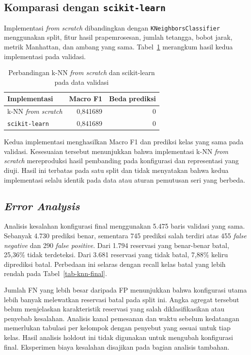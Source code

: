 \subsection{Komparasi dengan \texttt{scikit-learn}}

Implementasi \textit{from scratch} dibandingkan dengan \texttt{KNeighborsClassifier} menggunakan split, fitur hasil prapemrosesan, jumlah tetangga, bobot jarak, metrik Manhattan, dan ambang yang sama. Tabel~\ref{tab-knn-sklearn} merangkum hasil kedua implementasi pada validasi.

\begin{table}[H]
    \centering
    \caption{Perbandingan k-NN \textit{from scratch} dan scikit-learn pada data validasi}
    \label{tab-knn-sklearn}
    \begin{tabular}{lrr}
        \hline
        Implementasi          & Macro F1 & Beda prediksi \\
        \hline
        k-NN \textit{from scratch} & 0,841689 & 0             \\
        \texttt{scikit-learn} & 0,841689 & 0             \\
        \hline
    \end{tabular}
\end{table}

Kedua implementasi menghasilkan Macro F1 dan prediksi kelas yang sama pada validasi. Kesesuaian tersebut menunjukkan bahwa implementasi k-NN \textit{from scratch} mereproduksi hasil pembanding pada konfigurasi dan representasi yang diuji. Hasil ini terbatas pada satu split dan tidak menyatakan bahwa kedua implementasi selalu identik pada data atau aturan pemutusan seri yang berbeda.

\subsection{\textit{Error Analysis}}

Analisis kesalahan konfigurasi final menggunakan 5.475 baris validasi yang sama. Sebanyak 4.730 prediksi benar, sementara 745 prediksi salah terdiri atas 455 \textit{false negative} dan 290 \textit{false positive}. Dari 1.794 reservasi yang benar-benar batal, 25,36\% tidak terdeteksi. Dari 3.681 reservasi yang tidak batal, 7,88\% keliru diprediksi batal. Perbedaan ini selaras dengan recall kelas batal yang lebih rendah pada Tabel~\ref{tab-knn-final}.

Jumlah FN yang lebih besar daripada FP menunjukkan bahwa konfigurasi utama lebih banyak melewatkan reservasi batal pada split ini. Angka agregat tersebut belum menjelaskan karakteristik reservasi yang salah diklasifikasikan atau penyebab kesalahan. Analisis kanal pemesanan dan waktu sebelum kedatangan memerlukan tabulasi per kelompok dengan penyebut yang sesuai untuk tiap kelas. Hasil analisis holdout ini tidak digunakan untuk mengubah konfigurasi final. Eksperimen biaya kesalahan disajikan pada bagian analisis tambahan.

